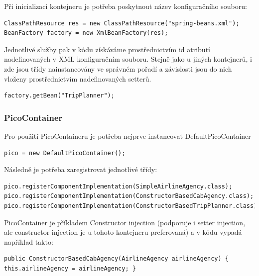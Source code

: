 \documentclass[a4paper,conference]{IEEEtran}
\begin{document}
Při inicializaci kontejneru je potřeba poskytnout název konfiguračního souboru:

\lstset{language=Java,caption=Inicializace kontejneru,label=listing:Java}
\begin{lstlisting}
ClassPathResource res = new ClassPathResource("spring-beans.xml"); BeanFactory factory = new XmlBeanFactory(res);
\end{lstlisting}

Jednotlivé služby pak v kódu získáváme prostřednictvím id atributí nadefinovaných v XML konfiguračním souboru. Stejně jako u jiných kontejnerů, i zde jsou třídy nainstancovány ve správném pořadí a závislosti jsou do nich vloženy prostřednictvím nadefinovaných setterů.

\lstset{language=Java,caption=Inicializace kontejneru,label=listing:Java}
\begin{lstlisting}
factory.getBean("TripPlanner");
\end{lstlisting}

\subsubsection{PicoContainer}

Pro použití PicoContaineru je potřeba nejprve instancovat  DefaultPicoContainer

\lstset{language=Java,caption=Inicializace kontejneru,label=listing:Java}
\begin{lstlisting}
pico = new DefaultPicoContainer();
\end{lstlisting}

Následně je potřeba zaregistrovat jednotlivé třídy:

\lstset{language=Java,caption=Registrace tříd v kontejneru,label=listing:Java}
\begin{lstlisting}
pico.registerComponentImplementation(SimpleAirlineAgency.class); pico.registerComponentImplementation(ConstructorBasedCabAgency.class); pico.registerComponentImplementation(ConstructorBasedTripPlanner.class);
\end{lstlisting}

PicoContainer je příkladem Constructor injection (podporuje i setter injection, ale constructor injection je u tohoto kontejneru preferovaná) a v kódu vypadá například takto:

\lstset{language=Java,caption=Použití PicoContainer,label=listing:Java}
\begin{lstlisting}
public ConstructorBasedCabAgency(AirlineAgency airlineAgency) {  this.airlineAgency = airlineAgency; }
\end{lstlisting}
\end{document}
